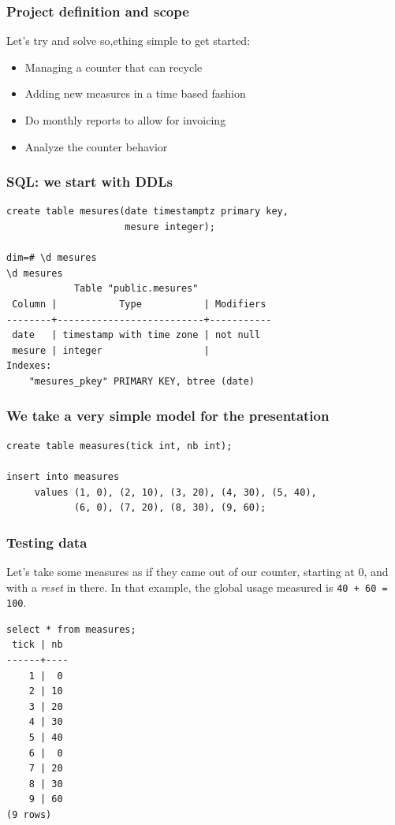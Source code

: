 \documentclass{beamer}
\begin{document}
\begin{frame}[fragile]
  \frametitle{Project definition and scope}

  Let's try and solve so,ething simple to get started:

  \begin{itemize}
    \item Managing a counter that can recycle
    \item Adding new measures in a time based fashion
    \item Do monthly reports to allow for invoicing
    \item Analyze the counter behavior
  \end{itemize}
\end{frame}

\begin{frame}[fragile]
  \frametitle{SQL: we start with DDLs}

  \vfill

\begin{example}[DDL]
\begin{verbatim}
create table mesures(date timestamptz primary key,
                     mesure integer);

dim=# \d mesures
\d mesures
            Table "public.mesures"
 Column |           Type           | Modifiers 
--------+--------------------------+-----------
 date   | timestamp with time zone | not null
 mesure | integer                  | 
Indexes:
    "mesures_pkey" PRIMARY KEY, btree (date)
\end{verbatim}
\end{example}
\end{frame}

\begin{frame}[fragile]
  \frametitle{We take a very simple model for the presentation}

\begin{verbatim}
create table measures(tick int, nb int);

insert into measures
     values (1, 0), (2, 10), (3, 20), (4, 30), (5, 40),
            (6, 0), (7, 20), (8, 30), (9, 60);
\end{verbatim}
\end{frame}

\begin{frame}[fragile]
  \frametitle{Testing data}

  Let's take some measures as if they came out of our counter, starting at
  0, and with a \textit{reset} in there. In that example, the global usage
  measured is \texttt{40 + 60 = 100}.

\begin{verbatim}
select * from measures;
 tick | nb 
------+----
    1 |  0
    2 | 10
    3 | 20
    4 | 30
    5 | 40
    6 |  0
    7 | 20
    8 | 30
    9 | 60
(9 rows)
\end{verbatim}
\end{frame}
\end{document}
